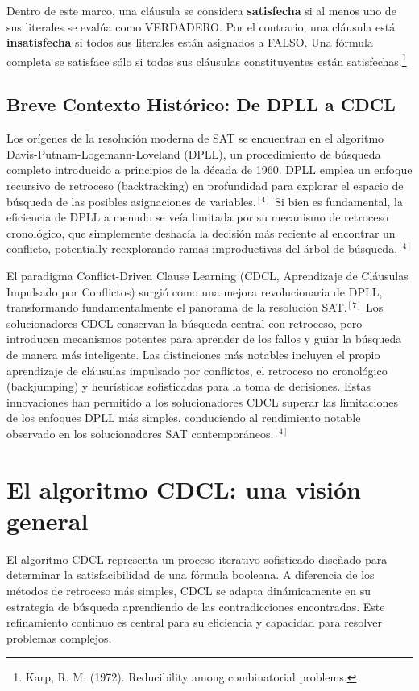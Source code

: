 \documentclass{article}
\begin{document}
Dentro de este marco, una cláusula se considera \textbf{satisfecha} si al menos uno de sus literales se evalúa como VERDADERO. Por el contrario, una cláusula está \textbf{insatisfecha} si todos sus literales están asignados a FALSO. Una fórmula completa se satisface sólo si todas sus cláusulas constituyentes están satisfechas.\footnote{Karp, R. M. (1972). Reducibility among combinatorial problems.}

\subsection{Breve Contexto Histórico: De DPLL a CDCL}

Los orígenes de la resolución moderna de SAT se encuentran en el algoritmo Davis-Putnam-Logemann-Loveland (DPLL), un procedimiento de búsqueda completo introducido a principios de la década de 1960. DPLL emplea un enfoque recursivo de retroceso (backtracking) en profundidad para explorar el espacio de búsqueda de las posibles asignaciones de variables.$^{[4]}$ Si bien es fundamental, la eficiencia de DPLL a menudo se veía limitada por su mecanismo de retroceso cronológico, que simplemente deshacía la decisión más reciente al encontrar un conflicto, potentially reexplorando ramas improductivas del árbol de búsqueda.$^{[4]}$

El paradigma Conflict-Driven Clause Learning (CDCL, Aprendizaje de Cláusulas Impulsado por Conflictos) surgió como una mejora revolucionaria de DPLL, transformando fundamentalmente el panorama de la resolución SAT.$^{[7]}$ Los solucionadores CDCL conservan la búsqueda central con retroceso, pero introducen mecanismos potentes para aprender de los fallos y guiar la búsqueda de manera más inteligente. Las distinciones más notables incluyen el propio aprendizaje de cláusulas impulsado por conflictos, el retroceso no cronológico (backjumping) y heurísticas sofisticadas para la toma de decisiones. Estas innovaciones han permitido a los solucionadores CDCL superar las limitaciones de los enfoques DPLL más simples, conduciendo al rendimiento notable observado en los solucionadores SAT contemporáneos.$^{[4]}$

\section{El algoritmo CDCL: una visión general}

El algoritmo CDCL representa un proceso iterativo sofisticado diseñado para determinar la satisfacibilidad de una fórmula booleana. A diferencia de los métodos de retroceso más simples, CDCL se adapta dinámicamente en su estrategia de búsqueda aprendiendo de las contradicciones encontradas. Este refinamiento continuo es central para su eficiencia y capacidad para resolver problemas complejos.
\end{document}
